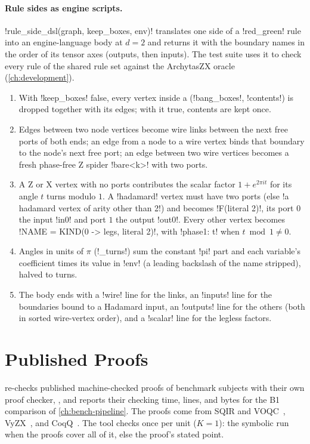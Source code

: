 {\paragraph{Rule sides as engine scripts.} \py!rule_side_dsl(graph, keep_boxes, env)! translates one side of a \code!red_green! rule into an engine-language body at $d=2$ and returns it with the boundary names in the order of its tensor axes (outputs, then inputs). The test suite uses it to check every rule of the shared rule set against the ArchytasZX oracle (\cref{ch:development}).
\begin{enumerate}
\item With \py!keep_boxes! false, every vertex inside a \bbox{} (\code!bang_boxes!, \code!contents!) is dropped together with its edges; with it true, \bbox{} contents are kept once.
\item Edges between two node vertices become wire links between the next free ports of both ends; an edge from a node to a wire vertex binds that boundary to the node's next free port; an edge between two wire vertices becomes a fresh phase-free Z spider \code!bare<k>! with two ports.
\item A Z or X vertex with no ports contributes the scalar factor $1+e^{2\pi i t}$ for its angle $t$ turns modulo $1$. A \code!hadamard! vertex must have two ports (else \code!a hadamard vertex of arity other than 2!) and becomes \azx!F(literal 2)!, its port $0$ the input \code!in0! and port $1$ the output \code!out0!. Every other vertex becomes \azx!NAME = KIND(0 -> legs, literal 2)!, with \azx!phase{1: t}! when $t\bmod1\neq0$.
\item Angles in units of $\pi$ (\py!_turns!) sum the constant \code!pi! part and each variable's coefficient times its value in \py!env! (a leading backslash of the name stripped), halved to turns.
\item The body ends with a \azx!wire! line for the links, an \azx!inputs! line for the boundaries bound to a Hadamard input, an \azx!outputs! line for the others (both in sorted wire-vertex order), and a \azx!scalar! line for the legless factors.
\end{enumerate}

\section{Published Proofs}\label{sec:bench-tools-published}

 re-checks published machine-checked proofs of benchmark subjects with their own proof checker, , and reports their checking time, lines, and bytes for the B1 comparison of \cref{ch:bench-pipeline}. The proofs come from SQIR and VOQC~\cite{hietala2021sqir}, VyZX~\cite{lehmann2023vyzx}, and CoqQ~\cite{zhou2023coqq}. The tool checks once per unit ($K=1$): the symbolic run when the proofs cover all of it, else the proof's stated point.

}

